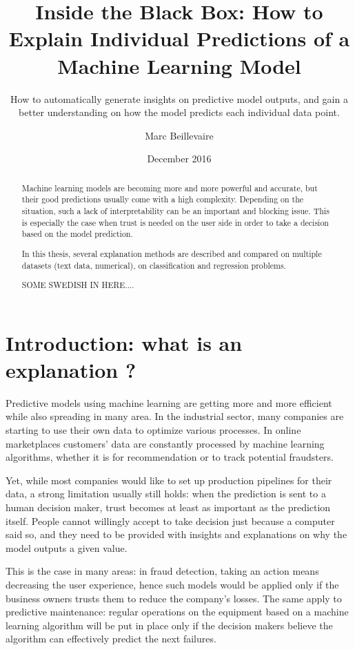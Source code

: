 \documentclass[a4paper,11pt]{kth-mag}
\title{Inside the Black Box: How to Explain Individual Predictions of a Machine Learning Model}
\subtitle{How to automatically generate insights on predictive model outputs, and gain 
	a better understanding on how the model predicts each individual data point.}
\author{Marc Beillevaire}
\date{December 2016}
\begin{document}
\frontmatter
\maketitle


\begin{abstract}
Machine learning models are becoming more and more powerful and accurate, but their good predictions usually come with a high complexity. Depending on the situation, such a lack of interpretability can be an important and blocking issue. This is especially the case when trust is needed on the user side in order to take a decision based on the model prediction.

In this thesis, several explanation methods are described and compared on multiple datasets (text data, numerical), on classification and regression problems.
\end{abstract}

\clearpage
{}
\begin{abstract}
  SOME SWEDISH IN HERE....
\end{abstract}
\clearpage
\tableofcontents
\mainmatter
\chapter{Introduction: what is an explanation ?}

Predictive models using machine learning are getting more and more efficient while also spreading in many area. In the industrial sector, many companies are starting to use their own data to optimize various processes. In online marketplaces customers' data are constantly processed by machine learning algorithms, whether it is for recommendation or to track potential fraudsters.

Yet, while most companies would like to set up production pipelines for their data, a strong limitation usually still holds: when the prediction is sent to a human decision maker, trust becomes at least as important as the prediction itself. People cannot willingly accept to take decision just because a computer said so, and they need to be provided with insights and explanations on why the model outputs a given value.

This is the case in many areas: in fraud detection, taking an action means decreasing the user experience, hence such models would be applied only if the business owners trusts them to reduce the company's losses. The same apply to predictive maintenance: regular operations on the equipment based on a machine learning algorithm will be put in place only if the decision makers believe the algorithm can effectively predict the next failures.
\end{document}
